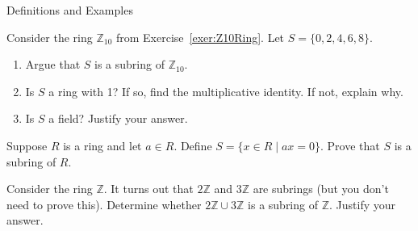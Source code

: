 \begin{section}{Definitions and Examples}
\begin{problem}
Consider the ring $\mathbb{Z}_{10}$ from Exercise~\ref{exer:Z10Ring}. Let $S=\{0,2,4,6,8\}$.
\begin{enumerate}[label=\rm{(\alph*)}]
\item Argue that $S$ is a subring of $\mathbb{Z}_{10}$.
\item Is $S$ a ring with 1?  If so, find the multiplicative identity.  If not, explain why.
\item Is $S$ a field? Justify your answer.
\end{enumerate}
\end{problem}

\begin{problem}
Suppose $R$ is a ring and let $a\in R$.  Define $S=\{x\in R\mid ax=0\}$.  Prove that $S$ is a subring of $R$.
\end{problem}

\begin{problem}
Consider the ring $\mathbb{Z}$.  It turns out that $2\mathbb{Z}$ and $3\mathbb{Z}$ are subrings (but you don't need to prove this).  Determine whether $2\mathbb{Z}\cup 3\mathbb{Z}$ is a subring of $\mathbb{Z}$.  Justify your answer.
\end{problem}

\end{section}

